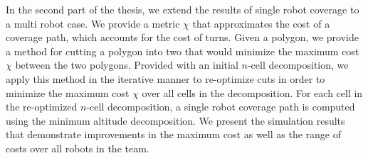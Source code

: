 In the second part of the thesis, we extend the results of single robot coverage to a multi robot case. We provide a metric $\chi$ that approximates the cost of a coverage path, which accounts for the cost of turns. Given a polygon, we provide a method for cutting a polygon into two that would minimize the maximum cost $\chi$ between the two polygons. Provided with an initial $n$-cell decomposition, we apply this method in the iterative manner to re-optimize cuts in order to minimize the maximum cost $\chi$ over all cells in the decomposition. For each cell in the re-optimized $n$-cell decomposition, a single robot coverage path is computed using the minimum altitude decomposition. We present the simulation results that demonstrate improvements in the maximum cost as well as the range of costs over all robots in the team.




